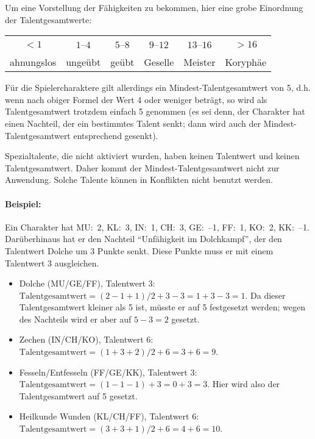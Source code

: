Um eine Vorstellung der Fähigkeiten zu bekommen, hier eine grobe Einordnung der Talentgesamtwerte:
\begin{tabular}[C]{|*6c|}
\hline
 $<1$ & $1$--$4$ & $5$--$8$ & $9$--$12$ & $13$--$16$ & $>16$ \\
 ahnungslos & ungeübt & geübt & Geselle & Meister & Koryphäe \\
\hline
\end{tabular}

Für die Spielercharaktere gilt allerdings ein Mindest-Talentgesamtwert von 5, d.h. wenn nach obiger Formel der Wert 4 oder weniger beträgt, so wird als Talentgesamtwert trotzdem einfach 5 genommen (es sei denn, der Charakter hat einen Nachteil, der ein bestimmtes Talent senkt; dann wird auch der Mindest-Talentgesamtwert entsprechend gesenkt).

Spezialtalente, die nicht aktiviert wurden, haben keinen Talentwert und keinen Talentgesamtwert. Daher kommt der Mindest-Talentgesamtwert nicht zur Anwendung. Solche Talente können in Konflikten nicht benutzt werden.

\begin{beispiel}
\paragraph{Beispiel:}

Ein Charakter hat MU:~2, KL:~3, IN:~1, CH:~3, GE:~--1, FF:~1, KO:~2, KK:~--1. Darüberhinaus hat er den Nachteil ``Unfähigkeit im Dolchkampf'', der den Talentwert Dolche um 3 Punkte senkt. Diese Punkte muss er mit einem Talentwert 3 ausgleichen.
\begin{itemize}
\item Dolche (MU/GE/FF), Talentwert 3: $\text{Talentgesamtwert} = (2-1+1)/2 + 3 -3 = 1 + 3 -3 = 1$. Da dieser Talentgesamtwert kleiner als 5 ist, müsste er auf 5 festgesetzt werden; wegen des Nachteils wird er aber auf $5-3=2$ gesetzt.
\item Zechen (IN/CH/KO), Talentwert 6: $\text{Talentgesamtwert} = (1+3+2)/2 + 6 = 3 + 6 = 9$.
\item Fesseln/Entfesseln (FF/GE/KK), Talentwert 3: $\text{Talentgesamtwert} = (1-1-1) + 3 = 0 + 3 = 3$. Hier wird also der Talentgesamtwert auf 5 gesetzt.
\item Heilkunde Wunden (KL/CH/FF), Talentwert 6: $\text{Talentgesamtwert} = (3+3+1)/2 + 6 = 4 + 6 = 10$.
\end{itemize}
\end{beispiel}



